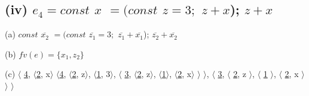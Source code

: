 \documentclass[11pt, oneside]{article}
\newcommand{\forceindent}{\leavevmode{\parindent=1.5em\indent}}
\begin{document}
\subsection*{(iv) $e_4 = const$ $x$ $= (const$ $z= 3;$ $z + x$); $z + x$}
\forceindent \par (a) $const$ $\overline{x_2}$ $= (const$ $\overline{z_1} = 3;$ $\overline{z_1} + \overline{x_1}$); $\overline{z_2} + \overline{x_2}$
\par (b) $fv (e) = \{x_1, z_2\}$
\par (c)
	$\langle$
		\uline{4},
		$\langle$\uline{2}, x$\rangle$
		$\langle$\uline{4}, 
			$\langle$\uline{2}, z$\rangle$,
			$\langle$\uline{1}, 3$\rangle$,
			$\langle$
				\uline{3}, 
				$\langle$\uline{2}, z$\rangle$,
				$\langle$\uline{1}$\rangle$,
				$\langle$\uline{2}, x$\rangle$
			$\rangle$
		$\rangle$,
		$\langle$
			\uline{3},
			$\langle$
				\uline{2}, z
			$\rangle$,
			$\langle$
				\uline{1}
			$\rangle$,
			$\langle$
				\uline{2}, x
			$\rangle$
		$\rangle$
	$\rangle$
\end{document}
